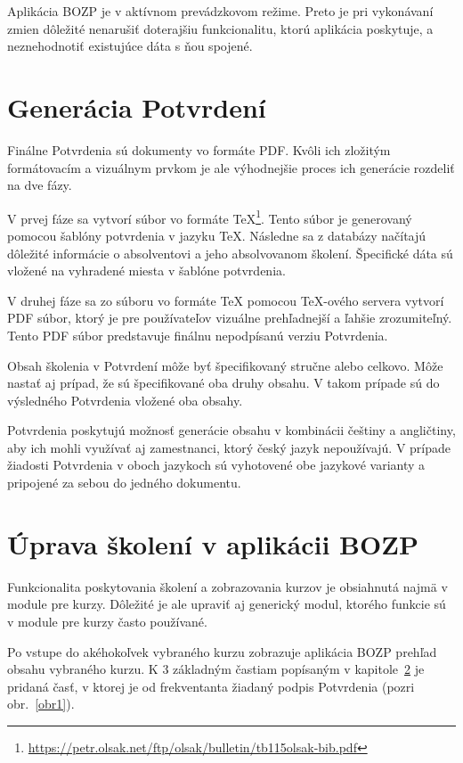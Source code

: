\documentclass[
  digital,     %
  oneside,     %
  nosansbold,  %
  nocolorbold, %
  lof,         %
  nolot,         %
]{fithesis4}
\begin{document}
Aplikácia BOZP je v aktívnom prevádzkovom režime. Preto je pri vykonávaní zmien dôležité nenarušiť doterajšiu funkcionalitu, ktorú aplikácia poskytuje, a neznehodnotiť existujúce dáta s ňou spojené.

\section{Generácia Potvrdení}
Finálne Potvrdenia sú dokumenty vo formáte PDF. Kvôli ich zložitým formátovacím a vizuálnym prvkom je ale výhodnejšie proces ich generácie rozdeliť na dve fázy.

V prvej fáze sa vytvorí súbor vo formáte \TeX\footnote{\url{https://petr.olsak.net/ftp/olsak/bulletin/tb115olsak-bib.pdf}}. Tento súbor je generovaný pomocou šablóny potvrdenia v jazyku \TeX. Následne sa z databázy načítajú dôležité informácie o absolventovi a jeho absolvovanom školení. Špecifické dáta sú vložené na vyhradené miesta v šablóne potvrdenia.

V druhej fáze sa zo súboru vo formáte \TeX{} pomocou \TeX-ového servera vytvorí PDF súbor, ktorý je pre používateľov vizuálne prehľadnejší a ľahšie zrozumiteľný. Tento PDF súbor predstavuje finálnu nepodpísanú verziu Potvrdenia.

Obsah školenia v Potvrdení môže byť špecifikovaný stručne alebo celkovo. Môže nastať aj prípad, že sú špecifikované oba druhy obsahu. V takom prípade sú do výsledného Potvrdenia vložené oba obsahy. 

Potvrdenia poskytujú možnosť generácie obsahu v kombinácii češtiny a angličtiny, aby ich mohli využívať aj zamestnanci, ktorý český jazyk nepoužívajú. V prípade žiadosti Potvrdenia v oboch jazykoch sú vyhotovené obe jazykové varianty a pripojené za sebou do jedného dokumentu.

\section{Úprava školení v aplikácii BOZP}
Funkcionalita poskytovania školení a zobrazovania kurzov je obsiahnutá najmä v module pre kurzy. Dôležité je ale upraviť aj generický modul, ktorého funkcie sú v module pre kurzy často používané.

Po vstupe do akéhokoľvek vybraného kurzu zobrazuje aplikácia BOZP prehľad obsahu vybraného kurzu. K 3 základným častiam popísaným v kapitole~\hyperref[kap-2]{2} je pridaná časť, v ktorej je od frekventanta žiadaný podpis Potvrdenia (pozri obr.~\ref{obr1}).
\end{document}
